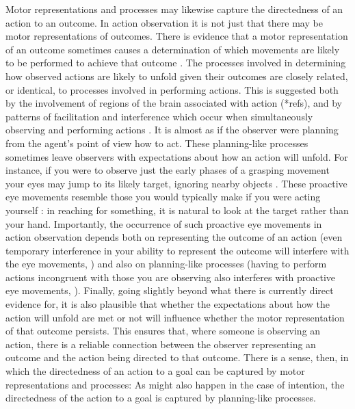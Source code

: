 \documentclass[12pt,\papersize]{extarticle}
\begin{document}
Motor representations and processes may likewise capture the directedness of an action to an outcome.  In action observation it is not just that there may be motor representations of outcomes. There is evidence that a motor representation of an outcome sometimes causes a determination of which movements are likely to be performed to achieve that outcome  \citep{kilner:2004_motor, urgesi:2010_simulating}. The processes involved in determining how observed actions are likely to unfold given their outcomes are closely related, or identical, to processes involved in performing actions. This is suggested both by the involvement of regions of the brain associated with action (*refs), and by patterns of facilitation and interference which occur when simultaneously observing and performing actions \citep{brass:2000_compatibility, kilner:2003_interference, craighero:2002_hand}. It is almost as if the observer were planning from the agent's point of view how to act. These planning-like processes sometimes leave observers with expectations about how an action will unfold.  For instance, if you were to observe just the early phases of a grasping movement your eyes may jump to its likely target, ignoring nearby objects \citep{ambrosini:2011_grasping}. These proactive eye movements resemble those you would typically make if you were acting yourself \citep{Flanagan:2003lm}: in reaching for something, it is natural to look at the target rather than your hand.  Importantly, the occurrence of such proactive eye movements in action observation depends both on representing the outcome of an action (even temporary interference in your ability to represent the outcome will interfere with the eye movements,  \citealp{Costantini:2012fk}) and also on planning-like processes (having to perform actions incongruent with those you are observing also interferes with proactive eye movements, \citealp{Costantini:2012uq}).  Finally, going slightly beyond what there is currently direct evidence for, it is also plausible that whether the expectations about how the action will unfold are met or not will influence whether the motor representation of that outcome persists.  This ensures that, where someone is observing an action, there is a reliable connection between the observer representing an outcome and the action being directed to that outcome.  There is a sense, then, in which the directedness of an action to a goal can be captured by motor representations and processes: As might also happen in the case of intention, the directedness of the action to a goal is captured by planning-like processes.  
\end{document}
